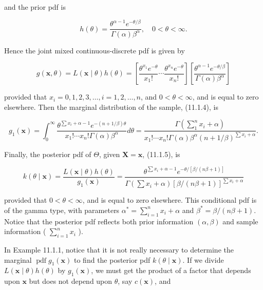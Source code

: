 and the prior pdf is

$$
h(\theta)=\frac{\theta^{\alpha-1} e^{-\theta / \beta}}{\Gamma(\alpha) \beta^{\alpha}}, \quad 0<\theta<\infty .
$$

Hence the joint mixed continuous-discrete pdf is given by

$$
g(\mathbf{x}, \theta)=L(\mathbf{x} \mid \theta) h(\theta)=\left[\frac{\theta^{x_{1}} e^{-\theta}}{x_{1}!} \cdots \frac{\theta^{x_{n}} e^{-\theta}}{x_{n}!}\right]\left[\frac{\theta^{\alpha-1} e^{-\theta / \beta}}{\Gamma(\alpha) \beta^{\alpha}}\right]
$$

provided that $x_{i}=0,1,2,3, \ldots, i=1,2, \ldots, n$, and $0<\theta<\infty$, and is equal to zero elsewhere. Then the marginal distribution of the sample, (11.1.4), is


\begin{equation*}
g_{1}(\mathbf{x})=\int_{0}^{\infty} \frac{\theta^{\sum x_{i}+\alpha-1} e^{-(n+1 / \beta) \theta}}{x_{1}!\cdots x_{n}!\Gamma(\alpha) \beta^{\alpha}} d \theta=\frac{\Gamma\left(\sum_{1}^{n} x_{i}+\alpha\right)}{x_{1}!\cdots x_{n}!\Gamma(\alpha) \beta^{\alpha}(n+1 / \beta)^{\sum x_{i}+\alpha}} . \tag{11.1.6}
\end{equation*}


Finally, the posterior pdf of $\Theta$, given $\mathbf{X}=\mathbf{x}$, (11.1.5), is


\begin{equation*}
k(\theta \mid \mathbf{x})=\frac{L(\mathbf{x} \mid \theta) h(\theta)}{g_{1}(\mathbf{x})}=\frac{\theta^{\sum x_{i}+\alpha-1} e^{-\theta /[\beta /(n \beta+1)]}}{\Gamma\left(\sum x_{i}+\alpha\right)[\beta /(n \beta+1)]^{\sum x_{i}+\alpha}} \tag{11.1.7}
\end{equation*}


provided that $0<\theta<\infty$, and is equal to zero elsewhere. This conditional pdf is of the gamma type, with parameters $\alpha^{*}=\sum_{i=1}^{n} x_{i}+\alpha$ and $\beta^{*}=\beta /(n \beta+1)$. Notice that the posterior pdf reflects both prior information $(\alpha, \beta)$ and sample information ( $\sum_{i=1}^{n} x_{i}$ ).

In Example 11.1.1, notice that it is not really necessary to determine the marginal $\operatorname{pdf} g_{1}(\mathbf{x})$ to find the posterior pdf $k(\theta \mid \mathbf{x})$. If we divide $L(\mathbf{x} \mid \theta) h(\theta)$ by $g_{1}(\mathbf{x})$, we must get the product of a factor that depends upon $\mathbf{x}$ but does not depend upon $\theta$, say $c(\mathbf{x})$, and

